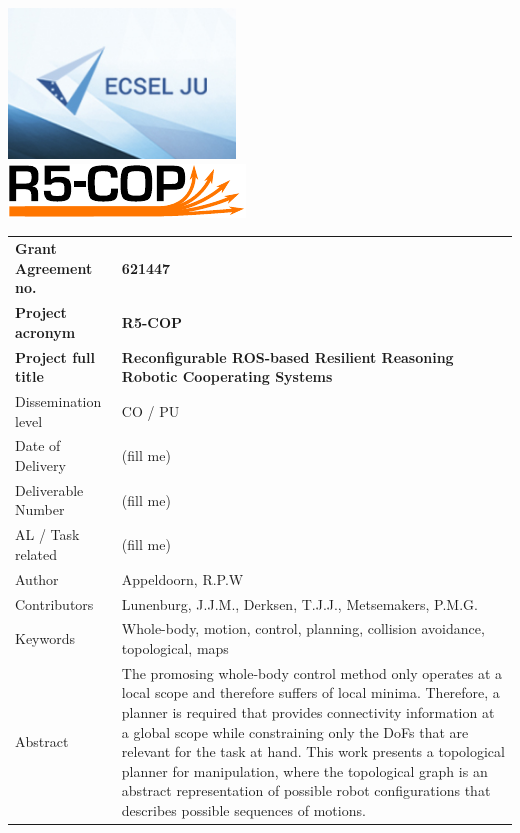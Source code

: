 \thispagestyle{empty}
{\noindent\centering\includegraphics[height=4cm]{pics/ecsel-logo}~~~~~~\\[3cm]}
{\noindent\centering\includegraphics{pics/r5-cop}\\[1cm]}

\begin{tabular}{|p{4.5cm}p{11cm}|}
\hline
\rowcolor[gray]{0.8}
\bf Grant Agreement no.
	& \bf 621447\\
\rowcolor[gray]{0.8}
\bf Project acronym
	& \bf R5-COP\\
\rowcolor[gray]{0.8}
\bf	Project full title
	& \bf Reconfigurable ROS-based Resilient Reasoning Robotic Cooperating Systems\\
\hline

Dissemination level
	& CO / PU\\
Date of Delivery
	& (fill me)\\
Deliverable Number
	& (fill me)\\
AL / Task related
	& (fill me)\\
Author
	& Appeldoorn, R.P.W\\
Contributors
	& Lunenburg, J.J.M., Derksen, T.J.J., Metsemakers, P.M.G.\\
Keywords
	& Whole-body, motion, control, planning, collision avoidance, topological, maps\\
Abstract &
	The promosing whole-body control method only operates at a local scope and therefore suffers of local minima. Therefore, a planner is required that provides connectivity information at a global scope while constraining only the DoFs that are relevant for the task at hand. This work presents a topological planner for manipulation, where the topological graph is an abstract representation of possible robot configurations that describes possible sequences of motions. \\
\hline
\end{tabular}
\vfill\eject
